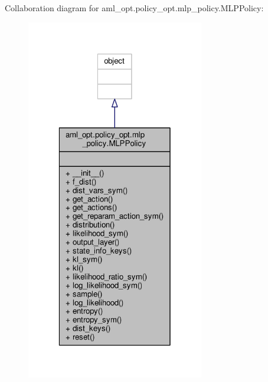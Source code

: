 Collaboration diagram for aml\-\_\-opt.\-policy\-\_\-opt.\-mlp\-\_\-policy.\-M\-L\-P\-Policy\-:
\nopagebreak
\begin{figure}[H]
\begin{center}
\leavevmode
\includegraphics[width=220pt]{classaml__opt_1_1policy__opt_1_1mlp__policy_1_1_m_l_p_policy__coll__graph}
\end{center}
\end{figure}
